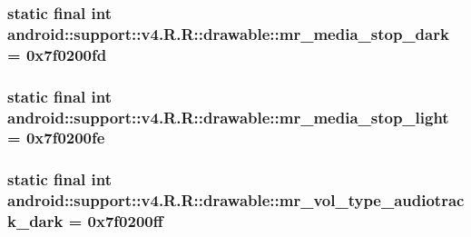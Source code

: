 \hypertarget{classandroid_1_1support_1_1v4_1_1_r_1_1drawable_64a2dbfe24c3e99ec68676f0bfdec726}{
\subsubsection[{mr\_\-media\_\-stop\_\-dark}]{\setlength{\rightskip}{0pt plus 5cm}static final int android::support::v4.R.R::drawable::mr\_\-media\_\-stop\_\-dark = 0x7f0200fd}}
\label{classandroid_1_1support_1_1v4_1_1_r_1_1drawable_64a2dbfe24c3e99ec68676f0bfdec726}


\hypertarget{classandroid_1_1support_1_1v4_1_1_r_1_1drawable_d8f801045acbfcaae0ef1be79d6c4748}{
\subsubsection[{mr\_\-media\_\-stop\_\-light}]{\setlength{\rightskip}{0pt plus 5cm}static final int android::support::v4.R.R::drawable::mr\_\-media\_\-stop\_\-light = 0x7f0200fe}}
\label{classandroid_1_1support_1_1v4_1_1_r_1_1drawable_d8f801045acbfcaae0ef1be79d6c4748}


\hypertarget{classandroid_1_1support_1_1v4_1_1_r_1_1drawable_2cf0b8b53635167389c05021fec48d72}{
\subsubsection[{mr\_\-vol\_\-type\_\-audiotrack\_\-dark}]{\setlength{\rightskip}{0pt plus 5cm}static final int android::support::v4.R.R::drawable::mr\_\-vol\_\-type\_\-audiotrack\_\-dark = 0x7f0200ff}}
\label{classandroid_1_1support_1_1v4_1_1_r_1_1drawable_2cf0b8b53635167389c05021fec48d72}


